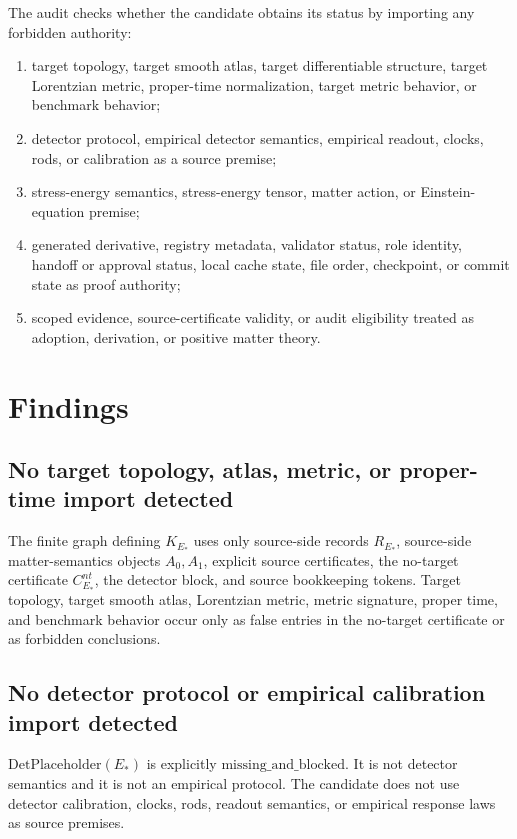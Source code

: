 \documentclass[11pt]{article}
\newcommand{\EStar}{E_{\ast}}
\newcommand{\DetPlaceholder}{\mathrm{DetPlaceholder}}
\newcommand{\KStar}{K_{E_{\ast}}}
\begin{document}
The audit checks whether the candidate obtains its status by importing any
forbidden authority:

\begin{enumerate}[label=(\arabic*)]
  \item target topology, target smooth atlas, target differentiable
        structure, target Lorentzian metric, proper-time normalization,
        target metric behavior, or benchmark behavior;
  \item detector protocol, empirical detector semantics, empirical readout,
        clocks, rods, or calibration as a source premise;
  \item stress-energy semantics, stress-energy tensor, matter action, or
        Einstein-equation premise;
  \item generated derivative, registry metadata, validator status, role
        identity, handoff or approval status, local cache state, file order,
        checkpoint, or commit state as proof authority;
  \item scoped evidence, source-certificate validity, or audit eligibility
        treated as adoption, derivation, or positive matter theory.
\end{enumerate}

\section{Findings}

\subsection{No target topology, atlas, metric, or proper-time import detected}

The finite graph defining \(\KStar\) uses only source-side records
\(R_{\EStar}\), source-side matter-semantics objects \(A_0,A_1\), explicit
source certificates, the no-target certificate \(C^{nt}_{\EStar}\), the
detector block, and source bookkeeping tokens. Target topology, target smooth
atlas, Lorentzian metric, metric signature, proper time, and benchmark
behavior occur only as false entries in the no-target certificate or as
forbidden conclusions.

\subsection{No detector protocol or empirical calibration import detected}

\(\DetPlaceholder(\EStar)\) is explicitly
\(\mathrm{missing\_and\_blocked}\). It is not detector semantics and it is not
an empirical protocol. The candidate does not use detector calibration, clocks,
rods, readout semantics, or empirical response laws as source premises.
\end{document}
